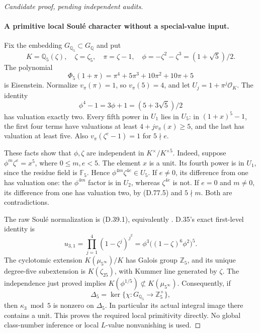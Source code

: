 \begin{proof}[Candidate proof, pending independent audits]
\paragraph{A primitive local Soul\'e character without a special-value input.}
Fix the embedding \(G_{\mathbb Q_5}\subset G_{\mathbb Q}\) and put
\[
 K=\mathbb Q_5(\zeta),\quad \zeta=\zeta_5,\quad
 \pi=\zeta-1,\quad
 \phi=-\zeta^2-\zeta^3=(1+\sqrt5)/2.
\]
The polynomial
\[
 \Phi_5(1+\pi)=\pi^4+5\pi^3+10\pi^2+10\pi+5
                                                               \tag{D.77.4}
\]
is Eisenstein. Normalize \(v_\pi(\pi)=1\), so \(v_\pi(5)=4\),
and let \(U_j=1+\pi^j\mathcal O_K\). The identity
\[
 \phi^4-1=3\phi+1=(5+3\sqrt5)/2
                                                               \tag{D.77.5}
\]
has valuation exactly two. Every fifth power in \(U_1\) lies in
\(U_5\): in \((1+x)^5-1\), the first four terms have valuations
at least \(4+jv_\pi(x)\ge5\), and the last has valuation at
least five. Also \(v_\pi(\zeta^e-1)=1\) for \(5\nmid e\).

These facts show that \(\phi,\zeta\) are independent in
\(K^\times/K^{\times5}\). Indeed, suppose
\(\phi^m\zeta^e=x^5\), where \(0\le m,e<5\).
The element \(x\) is a unit. Its fourth power is in \(U_1\),
since the residue field is \(\mathbb F_5\). Hence
\(\phi^{4m}\zeta^{4e}\in U_5\). If \(e\ne0\), its difference
from one has valuation one: the \(\phi^{4m}\) factor is in
\(U_2\), whereas \(\zeta^{4e}\) is not. If \(e=0\) and
\(m\ne0\), its difference from one has valuation two, by
(D.77.5) and \(5\nmid m\). Both are contradictions.

The raw Soul\'e normalization is (D.39.1), equivalently
\cite[(1.1)--(1.2)]{DE_NakamuraSakugawaWojtkowiak2017}.
D.35's exact first-level identity is
\[
 u_{3,1}=\prod_{j=1}^4(1-\zeta^j)^{j^2}
        =\phi^3\bigl((1-\zeta)^6\phi^2\bigr)^5.
                                                               \tag{D.77.6}
\]
The cyclotomic extension \(K(\mu_{5^\infty})/K\) has Galois group
\(\mathbb Z_5\), and its unique degree-five subextension is
\(K(\zeta_{25})\), with Kummer line generated by \(\zeta\).
The independence just proved implies
\(K(\phi^{1/5})\not\subset K(\mu_{5^\infty})\).
Consequently, if
\[
 \Delta_5=\ker\{\chi:G_{\mathbb Q_5}\to\mathbb Z_5^\times\},
\]
then \(\kappa_3\bmod5\) is nonzero on \(\Delta_5\).
In particular its actual integral image there contains a unit.
This proves the required local primitivity directly. No global
class-number inference or local \(L\)-value nonvanishing is used.


\end{proof}
